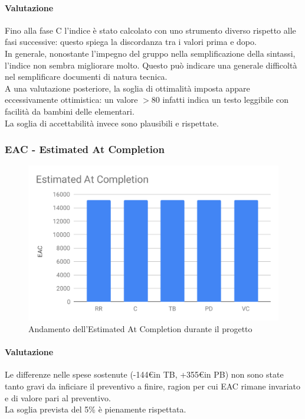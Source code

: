 \paragraph*{Valutazione}
Fino alla fase C l'indice è stato calcolato con uno strumento diverso rispetto alle fasi successive: questo spiega la discordanza tra i valori prima e dopo.\\
In generale, nonostante l'impegno del gruppo nella semplificazione della sintassi, l'indice non sembra migliorare molto.
Questo può indicare una generale difficoltà nel semplificare documenti di natura tecnica.\\
A una valutazione posteriore, la soglia di ottimalità imposta appare eccessivamente ottimistica: un valore $>80$ infatti indica un testo leggibile con facilità da bambini delle elementari.\\
La soglia di accettabilità invece sono plausibili e rispettate. 


\subsubsection{EAC - Estimated At Completion}
\begin{figure}[H]
	\centering
	\includegraphics[scale=0.7]{res/images/RA/eac.pdf}
	\caption{Andamento dell'Estimated At Completion durante il progetto}
\end{figure}
\paragraph*{Valutazione}
Le differenze nelle spese sostenute (-144\euro in TB, +355\euro in PB) non sono state tanto gravi da inficiare il preventivo a finire, ragion per cui EAC rimane invariato e di valore pari al preventivo.\\
La soglia prevista del 5\% è pienamente rispettata.

